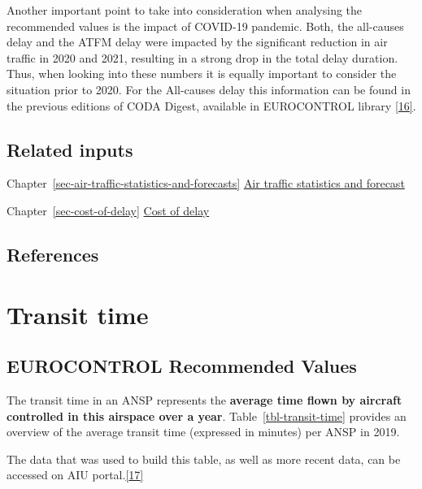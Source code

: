 \documentclass[
  11pt,
  a4paper,
]{book}
\begin{document}
Another important point to take into consideration when analysing the
recommended values is the impact of COVID-19 pandemic. Both, the
all-causes delay and the ATFM delay were impacted by the significant
reduction in air traffic in 2020 and 2021, resulting in a strong drop in
the total delay duration. Thus, when looking into these numbers it is
equally important to consider the situation prior to 2020. For the
All-causes delay this information can be found in the previous editions
of CODA Digest, available in EUROCONTROL library
\protect\hyperlink{ref-ectllibrary}{{[}16{]}}.

\hypertarget{related-inputs-3}{%
\section{Related inputs}\label{related-inputs-3}}

Chapter~\ref{sec-air-traffic-statistics-and-forecasts}
\protect\hyperlink{sec-air-traffic-statistics-and-forecasts}{Air traffic
statistics and forecast}

Chapter~\ref{sec-cost-of-delay}
\protect\hyperlink{sec-cost-of-delay}{Cost of delay}

\hypertarget{references-4}{%
\section{References}\label{references-4}}

\hypertarget{sec-transit-time}{%
\chapter{Transit time}\label{sec-transit-time}}

\hypertarget{eurocontrol-recommended-values-2}{%
\section{EUROCONTROL Recommended
Values}\label{eurocontrol-recommended-values-2}}

The transit time in an ANSP represents the \textbf{average time flown by
aircraft controlled in this airspace over a year}.
Table~\ref{tbl-transit-time} provides an overview of the average transit
time (expressed in minutes) per ANSP in 2019.

The data that was used to build this table, as well as more recent data,
can be accessed on AIU
portal.\protect\hyperlink{ref-aiuportal}{{[}17{]}}
\end{document}
